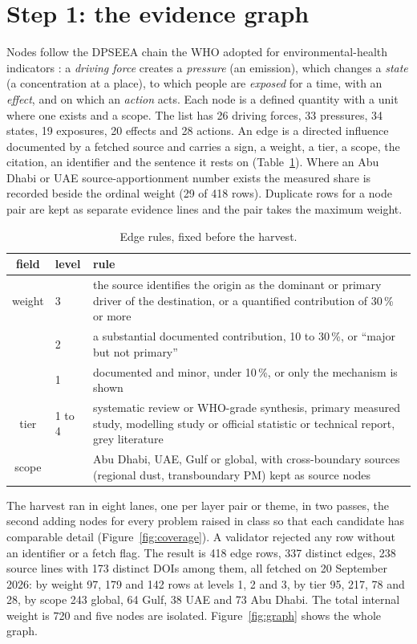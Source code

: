 \documentclass[10pt,a4paper]{article}
\begin{document}
\section{Step 1: the evidence graph}\label{sec:graph}
Nodes follow the DPSEEA chain the WHO adopted for environmental-health indicators \citep{Corvalan1999}: a \emph{driving force} creates a \emph{pressure} (an emission), which changes a \emph{state} (a concentration at a place), to which people are \emph{exposed} for a time, with an \emph{effect}, and on which an \emph{action} acts. Each node is a defined quantity with a unit where one exists and a scope. The list has 26 driving forces, 33 pressures, 34 states, 19 exposures, 20 effects and 28 actions. An edge is a directed influence documented by a fetched source and carries a sign, a weight, a tier, a scope, the citation, an identifier and the sentence it rests on (Table~\ref{tab:rules}). Where an Abu Dhabi or UAE source-apportionment number exists the measured share is recorded beside the ordinal weight (29 of 418 rows). Duplicate rows for a node pair are kept as separate evidence lines and the pair takes the maximum weight.

\begin{table}[t]\centering\small
\caption{Edge rules, fixed before the harvest.}\label{tab:rules}
\begin{tabular}{@{}clp{10.6cm}@{}}\toprule
field & level & rule\\ \midrule
weight & 3 & the source identifies the origin as the dominant or primary driver of the destination, or a quantified contribution of 30\,\% or more\\
 & 2 & a substantial documented contribution, 10 to 30\,\%, or ``major but not primary''\\
 & 1 & documented and minor, under 10\,\%, or only the mechanism is shown\\
tier & 1 to 4 & systematic review or WHO-grade synthesis, primary measured study, modelling study or official statistic or technical report, grey literature\\
scope & & Abu Dhabi, UAE, Gulf or global, with cross-boundary sources (regional dust, transboundary PM) kept as source nodes\\
\bottomrule\end{tabular}\end{table}

The harvest ran in eight lanes, one per layer pair or theme, in two passes, the second adding nodes for every problem raised in class so that each candidate has comparable detail (Figure~\ref{fig:coverage}). A validator rejected any row without an identifier or a fetch flag. The result is 418 edge rows, 337 distinct edges, 238 source lines with 173 distinct DOIs among them, all fetched on 20 September 2026: by weight 97, 179 and 142 rows at levels 1, 2 and 3, by tier 95, 217, 78 and 28, by scope 243 global, 64 Gulf, 38 UAE and 73 Abu Dhabi. The total internal weight is 720 and five nodes are isolated. Figure~\ref{fig:graph} shows the whole graph.
\end{document}
